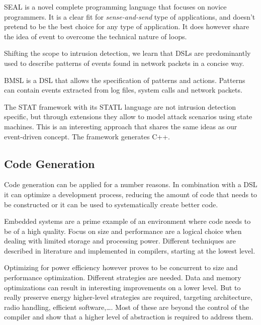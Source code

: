 \documentclass[conference]{IEEEtran}
\begin{document}
SEAL\cite{elsts2013seal} is a novel complete programming language that focuses
on novice programmers. It is a clear fit for \emph{sense-and-send} type of
applications, and doesn't pretend to be the best choice for any type of
application. It does however share the idea of event to overcome the technical
nature of loops.

Shifting the scope to intrusion detection, we learn that DSLs are predominantly
used to describe patterns of events found in network
packets\cite{sekar1999high,roesch1999snort} in a concise way.

BMSL\cite{uppuluri2001experiences} is a DSL that allows the specification of
patterns and actions. Patterns can contain events extracted from log files,
system calls and network packets.

The STAT framework with its STATL
language\cite{eckmann2002statl,vigna2003designing} are not intrusion detection
specific, but through extensions they allow to model attack scenarios using
state machines. This is an interesting approach that shares the same ideas as
our event-driven concept. The framework generates C++.

\subsection{Code Generation}

Code generation can be applied for a number reasons. In combination with a DSL
it can optimize a development process, reducing the amount of code that needs
to be constructed or it can be used to systematically create better code. 

Embedded systems are a prime example of an environment where code needs to be
of a high quality. Focus on size and performance are a logical choice when
dealing with limited storage and processing power. Different techniques are
described in literature and implemented in compilers, starting at the lowest
level\cite{leupers2000code, marwedel2002code}.

Optimizing for power efficiency however proves to be concurrent to size and
performance optimization. Different strategies are needed. Data and memory
optimizations \cite{panda2001data} can result in interesting improvements on a
lower level. But to really preserve energy higher-level strategies are
required, targeting architecture, radio handling, efficient
software,\dots\cite{naik2001software}. Most of these are beyond the control of
the compiler and show that a higher level of abstraction is required to address
them.
\end{document}
